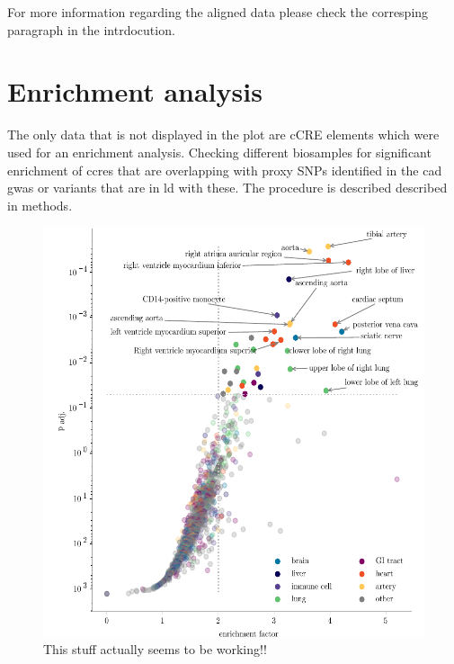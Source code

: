     For more information regarding the aligned data please check the corresping paragraph in the intrdocution.

\section{Enrichment analysis}
\label{sec:result_enrichment}
The only data that is not displayed in the plot are cCRE elements which were used for an enrichment analysis. Checking different biosamples for significant enrichment of \acp{ccre} that are overlapping with proxy SNPs identified in the \ac{cad} \ac{gwas} or variants that are in \ac{ld} with these. The procedure is described described in methods.

\begin{figure}[h]
\capstart
    \centering
	\includegraphics{Abbildung/enrichment_scatter.pdf}

	\begin{minipage}{\captionwidth}
		\caption[enrichemtn]{ \newline This stuff actually seems to be working!!}
		\label{fig:enrichment}
	\end{minipage}
\end{figure}

